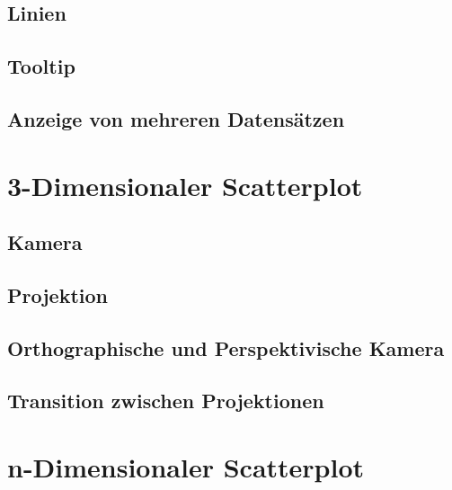 \subsection{Linien}
\subsection{Tooltip}
\subsection{Anzeige von mehreren Datensätzen}

\section{3-Dimensionaler Scatterplot}

\subsection{Kamera}
\subsection{Projektion}
\subsection{Orthographische und Perspektivische Kamera}
\subsection{Transition zwischen Projektionen}

\section{n-Dimensionaler Scatterplot}